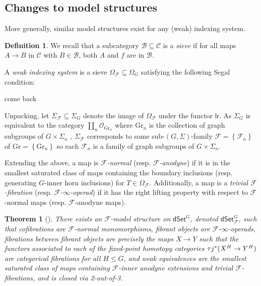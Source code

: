 \documentclass[a4paper,10pt]{article}%
\numberwithin{equation}{section}
\numberwithin{figure}{section}
\newtheorem{theorem}[equation]{Theorem}%
\theoremstyle{definition} %
\newtheorem{definition}[equation]{Definition}%
\newcommand{\set}[1]{\left\{#1\right\}}%
\newcommand{\dSet}{\mathsf{dSet}}
\newcommand{\F}{\ensuremath{\mathcal F}}
\renewcommand{\O}{\ensuremath{\mathcal O}}
\newcommand{\1}{\ensuremath{\mathbbm 1}}%
\begin{document}
\subsection{Changes to model structures}
More generally, similar model structures exist for any (weak) indexing system.
\begin{definition}
      We recall that a subcategory $\mathcal B \subseteq \mathcal C$ is a \textit{sieve} if for all maps $A \to B$ in $\mathcal C$
      with $B \in \mathcal B$, both $A$ and $f$ are in $\mathcal B$.

      A \textit{weak indexing system} is a sieve
      $\Omega_\F \subseteq \Omega_G$
      satisfying the following Segal condition:

      come back
\end{definition}

Unpacking, let $\Sigma_\F \subseteq \Sigma_G$ denote the image of $\Omega_\F$ under the functor $\mathsf{lr}$.
As $\Sigma_G$ is equivalent to the category $\coprod_n \O_{\mathrm{Gr}_n}$
where $\mathrm{Gr}_n$ is the collection of graph subgroups of $G \times \Sigma_n$ ,
$\Sigma_\F$ corresponds to some sub-$(G, \Sigma)$-family $\F = \set{\F_n}$ of $\mathrm{Gr} = \set{\mathrm{Gr}_n}$
so each $\F_n$ is a family of graph subgroups of $G \times \Sigma_n$.      

Extending the above, a map is \textit{$\F$-normal} (resp. \textit{$\F$-anodyne})
if it is in the smallest saturated class of maps containing the
boundary inclusions (resp. generating $G$-inner horn inclusions) for $T \in \Omega_\F$.
Additionally, a map is a \textit{trivial $\F$-fibration} (resp. \textit{$\F$-$\infty$-operad}) if it has the right lifting property with respect to $\F$-normal maps (resp. $\F$-anodyne maps).

\begin{theorem}[{\cite[\S 9]{Per18}}]
      There exists an $\F$-model structure on $\dSet^G$, denoted $\dSet^G_\F$, such that
      cofibrations are $\F$-normal monomorphisms,
      fibrant objects are $\F$-$\infty$-operads,
      fibrations between fibrant objects are precisely the maps $X \to Y$ such that the functors associated to each of the fixed-point homotopy categories $\tau j^{\**}(X^H \to Y^H)$ are categorical fibrations for all $H \leq G$,
      and weak equivalences are the smallest saturated class of maps containing $\F$-inner anodyne extensions and trivial $\F$-fibrations, and is closed via 2-out-of-3.
\end{theorem}
\end{document}
